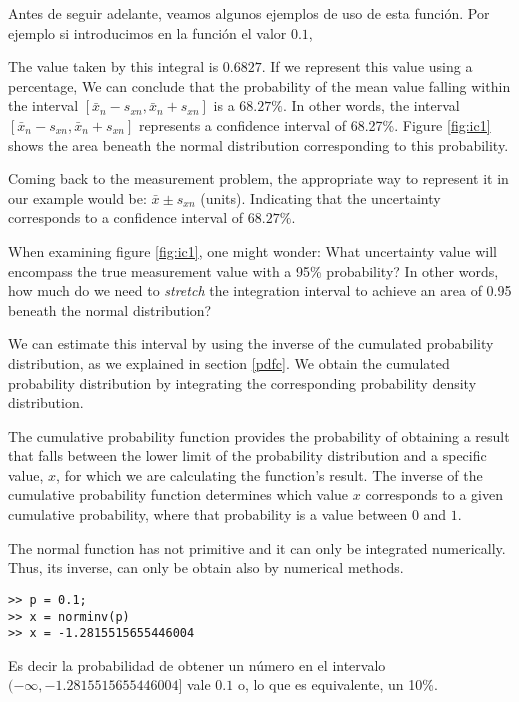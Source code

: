 \begin{paracol}{2}
Antes de seguir adelante, veamos algunos ejemplos de uso de esta función. Por ejemplo si introducimos en la función el valor $0.1$,

\switchcolumn
The value taken by this integral is $0.6827$. If we represent this value using a percentage, We can conclude that the probability of the mean value falling within the interval $[\bar{x}_n-s_{xn}, \bar{x}_n+s_{xn}]$ is a $68.27\%$. In other words, the interval $[\bar{x}_n-s_{xn}, \bar{x}_n+s_{xn}]$ represents a confidence interval  of 68.27\%. Figure \ref{fig:ic1} shows the area beneath the normal distribution corresponding to this probability.

Coming back to the measurement problem, the appropriate way to represent it in our example would be: $\bar{x}\pm s_{xn}$ (units). Indicating that the uncertainty corresponds to a confidence interval of $68.27\%$.

When examining figure \ref{fig:ic1}, one might wonder: What uncertainty value will encompass the true measurement value with a 95\% probability? In other words, how much do we need to \emph{stretch} the integration interval to achieve an area of 0.95 beneath the normal distribution?

We can estimate this interval by using the inverse of the cumulated probability distribution, as we explained in section \ref{pdfc}. We obtain the cumulated probability distribution by integrating the corresponding probability density distribution.     

The cumulative probability function provides the probability of obtaining a result that falls between the lower limit of the probability distribution and a specific value, $x$, for which we are calculating the function's result. The inverse of the cumulative probability function determines which value $x$ corresponds to a given cumulative probability, where that probability is a value between $0$ and $1$.

The normal function has not primitive and it can only be integrated numerically. Thus, its inverse, can only be obtain also by numerical methods. 


\end{paracol}


\begin{verbatim}
>> p = 0.1;
>> x = norminv(p)
>> x = -1.2815515655446004
\end{verbatim}

Es decir la probabilidad de obtener un número en el intervalo $(-\infty, -1.2815515655446004]$ vale $0.1$ o, lo que es equivalente, un 10\%.

